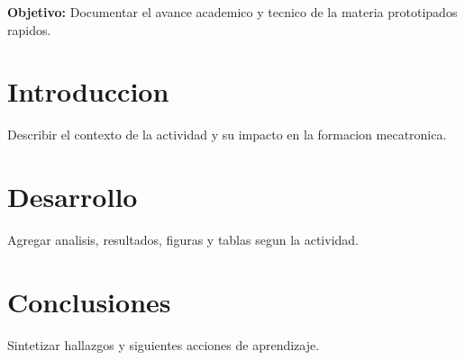 \documentclass[spanish,letterpaper,oneside]{article}
\begin{document}
\templatePortrait
\templatePagecfg
\onehalfspacing

\begin{abstractd}
\textbf{Objetivo:} Documentar el avance academico y tecnico de la materia prototipados rapidos.
\end{abstractd}

\templateIndex
\templateFinalcfg

\section{Introduccion}
Describir el contexto de la actividad y su impacto en la formacion mecatronica.

\section{Desarrollo}
Agregar analisis, resultados, figuras y tablas segun la actividad.

\section{Conclusiones}
Sintetizar hallazgos y siguientes acciones de aprendizaje.



\end{document}
